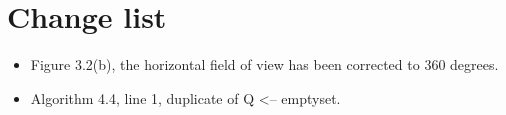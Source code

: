 \chapter*{Change list}

\begin{itemize}
 \item Figure 3.2(b), the horizontal field of view has been corrected to 360 degrees.
 \item Algorithm 4.4, line 1, duplicate of Q <-- emptyset.
\end{itemize}